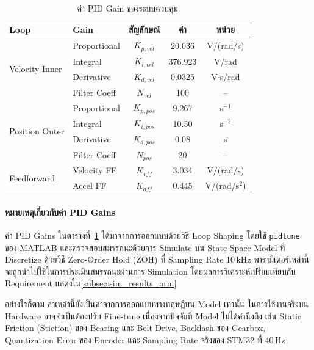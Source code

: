 \begin{table}[H]
  \centering
  \caption{ค่า PID Gain ของระบบควบคุม}
  \label{tab:pid_gains}
  \begin{tabular}{llccc}
    \toprule
    Loop & Gain & สัญลักษณ์ & ค่า & หน่วย \\
    \midrule
    \multirow{4}{*}{Velocity Inner} & Proportional & $K_{p,vel}$ & 20.036  & V/(rad/s) \\
                                    & Integral     & $K_{i,vel}$ & 376.923 & V/rad \\
                                    & Derivative   & $K_{d,vel}$ & 0.0325  & V$\cdot$s/rad \\
                                    & Filter Coeff & $N_{vel}$   & 100     & -- \\
    \midrule
    \multirow{4}{*}{Position Outer} & Proportional & $K_{p,pos}$ & 9.267  & s$^{-1}$ \\
                                    & Integral     & $K_{i,pos}$ & 10.50  & s$^{-2}$ \\
                                    & Derivative   & $K_{d,pos}$ & 0.08   & s \\
                                    & Filter Coeff & $N_{pos}$   & 20     & -- \\
    \midrule
    \multirow{2}{*}{Feedforward}    & Velocity FF  & $K_{vff}$   & 3.034  & V/(rad/s) \\
                                    & Accel FF     & $K_{aff}$   & 0.445  & V/(rad/s$^2$) \\
    \bottomrule
  \end{tabular}
\end{table}

\paragraph{หมายเหตุเกี่ยวกับค่า PID Gains}

ค่า PID Gains ในตารางที่~\ref{tab:pid_gains} ได้มาจากการออกแบบด้วยวิธี 
Loop Shaping โดยใช้ \texttt{pidtune} ของ MATLAB 
และตรวจสอบสมรรถนะด้วยการ Simulate บน State Space Model 
ที่ Discretize ด้วยวิธี Zero-Order Hold (ZOH) ที่ Sampling Rate 10\,kHz
พารามิเตอร์เหล่านี้จะถูกนำไปใช้ในการประเมินสมรรถนะผ่านการ Simulation โดยผลการวิเคราะห์เปรียบเทียบกับ Requirement แสดงใน\cref{subsec:sim_results_arm}

อย่างไรก็ตาม ค่าเหล่านี้ยังเป็นค่าจากการออกแบบทางทฤษฎีบน Model เท่านั้น
ในการใช้งานจริงบน Hardware อาจจำเป็นต้องปรับ Fine-tune 
เนื่องจากปัจจัยที่ Model ไม่ได้คำนึงถึง เช่น Static Friction (Stiction) 
ของ Bearing และ Belt Drive, Backlash ของ Gearbox, Quantization Error 
ของ Encoder และ Sampling Rate จริงของ STM32 ที่ 40\,Hz


